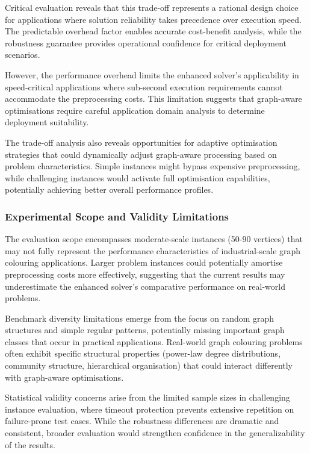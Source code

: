 Critical evaluation reveals that this trade-off represents a rational design choice for applications where solution reliability takes precedence over execution speed. The predictable overhead factor enables accurate cost-benefit analysis, while the robustness guarantee provides operational confidence for critical deployment scenarios.

However, the performance overhead limits the enhanced solver's applicability in speed-critical applications where sub-second execution requirements cannot accommodate the preprocessing costs. This limitation suggests that graph-aware optimisations require careful application domain analysis to determine deployment suitability.

The trade-off analysis also reveals opportunities for adaptive optimisation strategies that could dynamically adjust graph-aware processing based on problem characteristics. Simple instances might bypass expensive preprocessing, while challenging instances would activate full optimisation capabilities, potentially achieving better overall performance profiles.

\subsubsection{Experimental Scope and Validity Limitations}

The evaluation scope encompasses moderate-scale instances (50-90 vertices) that may not fully represent the performance characteristics of industrial-scale graph colouring applications. Larger problem instances could potentially amortise preprocessing costs more effectively, suggesting that the current results may underestimate the enhanced solver's comparative performance on real-world problems.

Benchmark diversity limitations emerge from the focus on random graph structures and simple regular patterns, potentially missing important graph classes that occur in practical applications. Real-world graph colouring problems often exhibit specific structural properties (power-law degree distributions, community structure, hierarchical organisation) that could interact differently with graph-aware optimisations.

Statistical validity concerns arise from the limited sample sizes in challenging instance evaluation, where timeout protection prevents extensive repetition on failure-prone test cases. While the robustness differences are dramatic and consistent, broader evaluation would strengthen confidence in the generalizability of the results.

